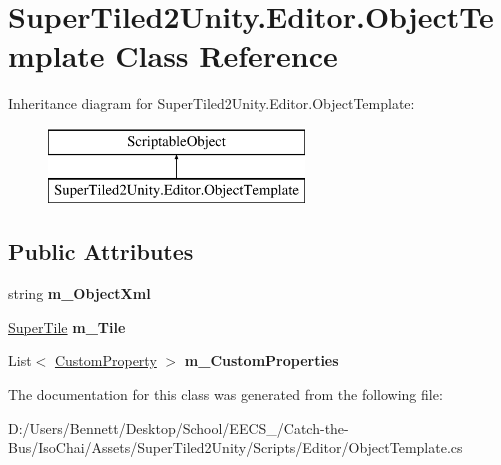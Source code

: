 \hypertarget{class_super_tiled2_unity_1_1_editor_1_1_object_template}{}\section{Super\+Tiled2\+Unity.\+Editor.\+Object\+Template Class Reference}
\label{class_super_tiled2_unity_1_1_editor_1_1_object_template}
Inheritance diagram for Super\+Tiled2\+Unity.\+Editor.\+Object\+Template\+:\begin{figure}[H]
\begin{center}
\leavevmode
\includegraphics[height=2.000000cm]{class_super_tiled2_unity_1_1_editor_1_1_object_template}
\end{center}
\end{figure}
\subsection*{Public Attributes}
\begin{DoxyCompactItemize}
\item 
\mbox{\label{class_super_tiled2_unity_1_1_editor_1_1_object_template_a41a8fdd1c53878146ef99870ec8db7ab}} 
string {\bfseries m\+\_\+\+Object\+Xml}
\item 
\mbox{\label{class_super_tiled2_unity_1_1_editor_1_1_object_template_a34adeb5502d01e490e4ff6e19256bc0c}} 
\mbox{\hyperlink{class_super_tiled2_unity_1_1_super_tile}{Super\+Tile}} {\bfseries m\+\_\+\+Tile}
\item 
\mbox{\label{class_super_tiled2_unity_1_1_editor_1_1_object_template_a6deaa817907d2e15a88e527f208c02e0}} 
List$<$ \mbox{\hyperlink{class_super_tiled2_unity_1_1_custom_property}{Custom\+Property}} $>$ {\bfseries m\+\_\+\+Custom\+Properties}
\end{DoxyCompactItemize}


The documentation for this class was generated from the following file\+:\begin{DoxyCompactItemize}
\item 
D\+:/\+Users/\+Bennett/\+Desktop/\+School/\+E\+E\+C\+S\+\_/\+Catch-\/the-\/\+Bus/\+Iso\+Chai/\+Assets/\+Super\+Tiled2\+Unity/\+Scripts/\+Editor/Object\+Template.\+cs\end{DoxyCompactItemize}
